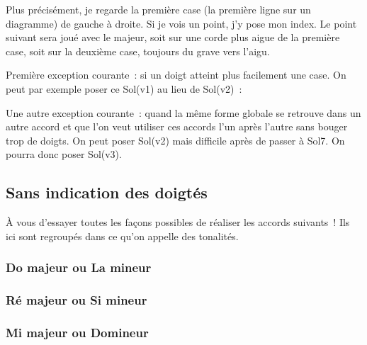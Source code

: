 \documentclass[11pt]{article}
\begin{document}

Plus précisément, je regarde la première case (la première ligne sur un
diagramme) de gauche à droite. Si je vois un point, j’y pose mon index.
Le point suivant sera joué avec le majeur, soit
sur une corde plus aigue de la première case, soit sur la deuxième case,
toujours du grave vers l’aigu.

Première exception courante~: si un doigt atteint plus facilement une case.
On peut par exemple poser ce Sol(v1) au lieu de Sol(v2)~:


Une autre exception courante~: quand la même forme globale se retrouve dans un
autre accord et que l’on veut utiliser ces accords l’un après l’autre sans
bouger trop de doigts. On peut poser Sol(v2) mais difficile après de passer à
Sol7. On pourra donc poser Sol(v3).


\subsection{Sans indication des doigtés}

À vous d’essayer toutes les façons possibles de réaliser les accords
suivants~! Ils ici sont regroupés dans ce qu’on appelle des tonalités.

\subsubsection{Do majeur ou La mineur}


\subsubsection{Ré majeur ou Si mineur}


\subsubsection{Mi majeur ou Do\shrp mineur}
\end{document}
